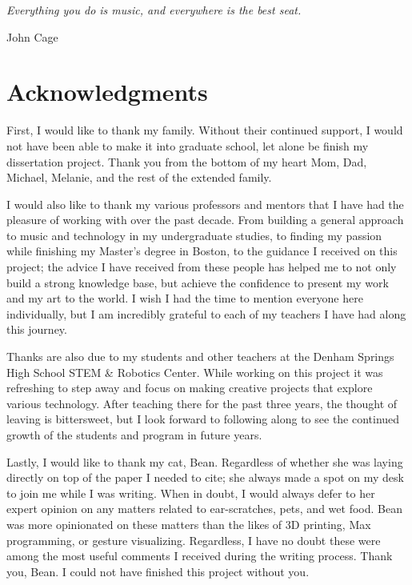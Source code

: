 \begin{centeredpage}
\epigraph{\textit{Everything you do is music, and everywhere is the best seat.}}{John Cage}
\end{centeredpage}


\chapter{Acknowledgments}

First, I would like to thank my family. Without their continued support, I would not have been able to make it into graduate school, let alone be finish my dissertation project. Thank you from the bottom of my heart Mom, Dad, Michael, Melanie, and the rest of the extended family. 

I would also like to thank my various professors and mentors that I have had the pleasure of working with over the past decade. From building a general approach to music and technology in my undergraduate studies, to finding my passion while finishing my Master’s degree in Boston, to the guidance I received on this project; the advice I have received from these people has helped me to not only build a strong knowledge base, but achieve the confidence to present my work and my art to the world. I wish I had the time to mention everyone here individually, but I am incredibly grateful to each of my teachers I have had along this journey.

Thanks are also due to my students and other teachers at the Denham Springs High School STEM \& Robotics Center. While working on this project it was refreshing to step away and focus on making creative projects that explore various technology. After teaching there for the past three years, the thought of leaving is bittersweet, but I look forward to following along to see the continued growth of the students and program in future years.

Lastly, I would like to thank my cat, Bean. Regardless of whether she was laying directly on top of the paper I needed to cite; she always made a spot on my desk to join me while I was writing. When in doubt, I would always defer to her expert opinion on any matters related to ear-scratches, pets, and wet food. Bean was more opinionated on these matters than the likes of 3D printing, Max programming, or gesture visualizing. Regardless, I have no doubt these were among the most useful comments I received during the writing process. Thank you, Bean. I could not have finished this project without you.

